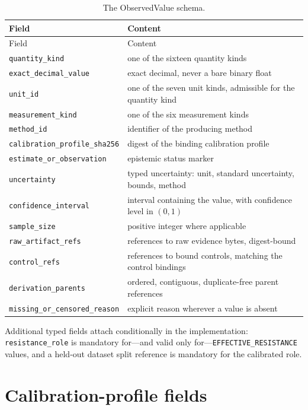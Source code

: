 \begin{longtable}{@{}ll@{}}
\caption{The ObservedValue schema.}\label{enums:tab:observed}\\
\toprule
Field & Content \\
\midrule
\endfirsthead
\toprule
Field & Content \\
\midrule
\endhead
\bottomrule
\endfoot
\texttt{quantity\_kind} & one of the sixteen quantity kinds \\
\texttt{exact\_decimal\_value} & exact decimal, never a bare binary float \\
\texttt{unit\_id} & one of the seven unit kinds, admissible for the quantity kind \\
\texttt{measurement\_kind} & one of the six measurement kinds \\
\texttt{method\_id} & identifier of the producing method \\
\texttt{calibration\_profile\_sha256} & digest of the binding calibration profile \\
\texttt{estimate\_or\_observation} & epistemic status marker \\
\texttt{uncertainty} & typed uncertainty: unit, standard uncertainty, bounds, method \\
\texttt{confidence\_interval} & interval containing the value, with confidence level in $(0,1)$ \\
\texttt{sample\_size} & positive integer where applicable \\
\texttt{raw\_artifact\_refs} & references to raw evidence bytes, digest-bound \\
\texttt{control\_refs} & references to bound controls, matching the control bindings \\
\texttt{derivation\_parents} & ordered, contiguous, duplicate-free parent references \\
\texttt{missing\_or\_censored\_reason} & explicit reason wherever a value is absent \\
\end{longtable}

Additional typed fields attach conditionally in the implementation: \texttt{resistance\_role} is mandatory for---and valid only for---\texttt{EFFECTIVE\_RESISTANCE} values, and a held-out dataset split reference is mandatory for the calibrated role.

\section{Calibration-profile fields}\label{enums:sec:profile}

